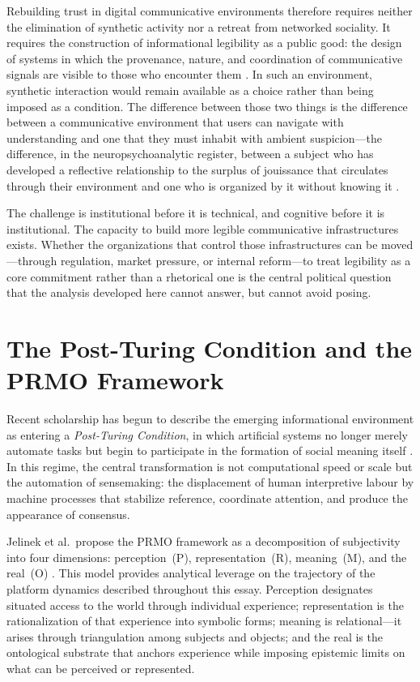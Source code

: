 \documentclass[12pt,a4paper]{article}
\begin{document}
Rebuilding trust in digital communicative environments therefore requires neither the elimination
of synthetic activity nor a retreat from networked sociality. It requires the construction of
informational legibility as a public good: the design of systems in which the provenance, nature,
and coordination of communicative signals are visible to those who encounter them
\citep{gillespie2018,noble2018}. In such an environment, synthetic interaction would remain
available as a choice rather than being imposed as a condition. The difference between those two
things is the difference between a communicative environment that users can navigate with
understanding and one that they must inhabit with ambient suspicion---the difference, in the
neuropsychoanalytic register, between a subject who has developed a reflective relationship to
the surplus of jouissance that circulates through their environment and one who is organized by
it without knowing it \citep{lacan2006,dallaglio2024}.

The challenge is institutional before it is technical, and cognitive before it is institutional.
The capacity to build more legible communicative infrastructures exists. Whether the
organizations that control those infrastructures can be moved---through regulation, market
pressure, or internal reform---to treat legibility as a core commitment rather than a rhetorical
one is the central political question that the analysis developed here cannot answer, but cannot
avoid posing.

\section{The Post-Turing Condition and the PRMO Framework}

Recent scholarship has begun to describe the emerging informational environment as entering
a \emph{Post-Turing Condition}, in which artificial systems no longer merely automate tasks
but begin to participate in the formation of social meaning itself \citep{jelinek2026}. In
this regime, the central transformation is not computational speed or scale but the automation
of sensemaking: the displacement of human interpretive labour by machine processes that
stabilize reference, coordinate attention, and produce the appearance of consensus.

Jelinek et al.\ propose the PRMO framework as a decomposition of subjectivity into four
dimensions: perception~(P), representation~(R), meaning~(M), and the real~(O)
\citep{jelinek2026}. This model provides analytical leverage on the trajectory of the platform
dynamics described throughout this essay. Perception designates situated access to the world
through individual experience; representation is the rationalization of that experience into
symbolic forms; meaning is relational---it arises through triangulation among subjects and
objects; and the real is the ontological substrate that anchors experience while imposing
epistemic limits on what can be perceived or represented.
\end{document}
